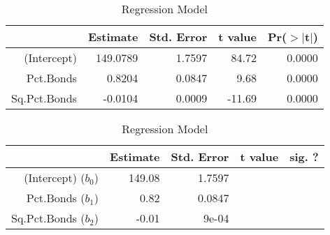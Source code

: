 \documentclass[11pt]{exam}
\begin{document}
\ifprintanswers
\begin{table}[ht]
\begin{center}
\begin{tabular}{rrrrr}
  \hline
 & Estimate & Std. Error & t value & Pr($>$$|$t$|$) \\ 
  \hline
(Intercept) & 149.0789 & 1.7597 & 84.72 & 0.0000 \\ 
  Pct.Bonds & 0.8204 & 0.0847 & 9.68 & 0.0000 \\ 
  Sq.Pct.Bonds & -0.0104 & 0.0009 & -11.69 & 0.0000 \\ 
   \hline
\end{tabular}
\caption{Regression Model}
\label{tab:401k-fit}
\end{center}
\end{table}\else
\begin{table}[ht]
\begin{center}
\begin{tabular}{rrrrr}
  \hline
  & Estimate & Std. Error & t value & sig. ? \\ 
  \hline
(Intercept) ($b_0$) &  149.08  &  1.7597  & &\\
Pct.Bonds ($b_1$) &  0.82  &  0.0847  & &\\
Sq.Pct.Bonds ($b_2$) &  -0.01  &  9e-04  & &\\
  \hline
\end{tabular}
\caption{Regression Model}
\label{tab:401k-fit}
\end{center}
\end{table}
\fi
\end{document}
